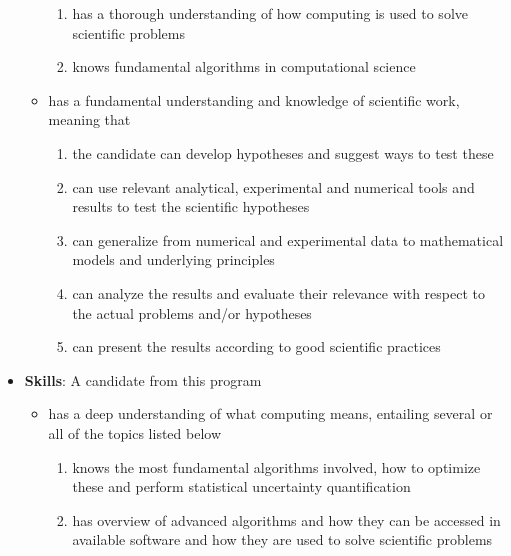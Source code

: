 \documentclass[%
oneside,                 %
final,                   %
10pt]{article}
\begin{document}
\begin{itemize}
\begin{itemize}
\begin{enumerate}
\item has a thorough understanding of how computing is used to  solve  scientific problems

\item knows fundamental algorithms in computational science

\end{enumerate}

\noindent
 \item has a fundamental understanding and knowledge of scientific work, meaning that
\begin{enumerate}

 \item the candidate can develop hypotheses and suggest ways to test these

 \item can use relevant analytical, experimental and numerical tools and results to test the scientific hypotheses

 \item can generalize from numerical and experimental data to mathematical models and underlying principles

 \item can analyze the results and evaluate their relevance with respect to the actual problems and/or hypotheses

 \item can present the results according to good scientific practices

\end{enumerate}

\noindent
\end{itemize}

\noindent
\item \textbf{Skills}: A candidate from this program
\begin{itemize}

 \item has a deep understanding of what computing means, entailing several or all of the topics listed below
\begin{enumerate}

 \item knows the most fundamental algorithms involved, how to optimize these and perform statistical uncertainty quantification

 \item has overview of advanced algorithms and how they can be accessed in available software and how they are used to solve scientific problems


\end{enumerate}
\end{itemize}
\end{itemize}
\end{document}
